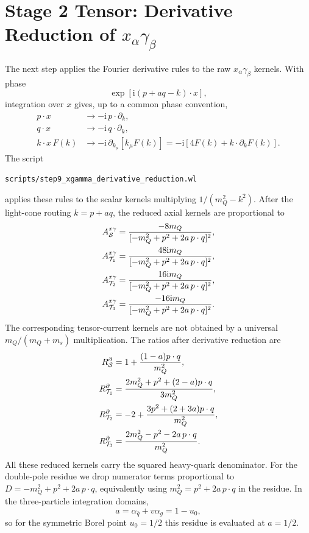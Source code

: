 \documentclass[11pt]{article}
\newcommand{\ii}{\mathrm{i}}
\begin{document}
\section{Stage 2 Tensor: Derivative Reduction of \(x_\alpha\gamma_\beta\)}

The next step applies the Fourier derivative rules to the raw
$x_\alpha\gamma_\beta$ kernels.  With phase
\begin{equation}
  \exp[\ii(p+a q-k)\cdot x],
\end{equation}
integration over $x$ gives, up to a common phase convention,
\begin{align}
  p\cdot x &\to -\ii\,p\cdot\partial_k,\\
  q\cdot x &\to -\ii\,q\cdot\partial_k,\\
  k\cdot x\,F(k)
  &\to
  -\ii\,\partial_{k_\mu}\!\left[k_\mu F(k)\right]
  =
  -\ii\left[4F(k)+k\cdot\partial_k F(k)\right].
\end{align}
The script
\begin{center}
  \texttt{scripts/step9\_xgamma\_derivative\_reduction.wl}
\end{center}
applies these rules to the scalar kernels multiplying
$1/(m_Q^2-k^2)$.  After the light-cone routing $k=p+a q$, the reduced axial
kernels are proportional to
\begin{align}
  A_{\cal S}^{x\gamma}
  &=
  \frac{-8m_Q}{[-m_Q^2+p^2+2a\,p\cdot q]^2},\\
  A_{{\cal T}_1}^{x\gamma}
  &=
  \frac{48\ii m_Q}{[-m_Q^2+p^2+2a\,p\cdot q]^2},\\
  A_{{\cal T}_2}^{x\gamma}
  &=
  \frac{16\ii m_Q}{[-m_Q^2+p^2+2a\,p\cdot q]^2},\\
  A_{{\cal T}_3}^{x\gamma}
  &=
  \frac{-16\ii m_Q}{[-m_Q^2+p^2+2a\,p\cdot q]^2}.
\end{align}
The corresponding tensor-current kernels are not obtained by a universal
$m_Q/(m_Q+m_s)$ multiplication.  The ratios after derivative reduction are
\begin{align}
  R_{\cal S}^{\partial}
  &=
  1+\frac{(1-a)p\cdot q}{m_Q^2},\\
  R_{{\cal T}_1}^{\partial}
  &=
  \frac{2m_Q^2+p^2+(2-a)p\cdot q}{3m_Q^2},\\
  R_{{\cal T}_2}^{\partial}
  &=
  -2+\frac{3p^2+(2+3a)p\cdot q}{m_Q^2},\\
  R_{{\cal T}_3}^{\partial}
  &=
  \frac{2m_Q^2-p^2-2a\,p\cdot q}{m_Q^2}.
\end{align}
All these reduced kernels carry the squared heavy-quark denominator.  For the
double-pole residue we drop numerator terms proportional to
$D=-m_Q^2+p^2+2a\,p\cdot q$, equivalently using
$m_Q^2=p^2+2a\,p\cdot q$ in the residue.  In the three-particle integration
domains,
\begin{equation}
  a=\alpha_{\bar q}+v\alpha_g=1-u_0,
\end{equation}
so for the symmetric Borel point $u_0=1/2$ this residue is evaluated at
$a=1/2$.
\end{document}
